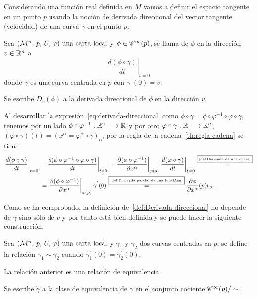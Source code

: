Considerando una función real definida en $M$ vamos a definir el espacio tangente en un
punto $p$ usando la noción de derivada direccional del vector tangente (velocidad) de una curva
$\gamma$ en el punto $p$.

\begin{definition}
  Sea $(\mathcal{M}^n,\thinspace p,\thinspace U,\thinspace \varphi)\textmd{ una carta local}$ y $\phi\in\mathscr{C}^\infty(p)$, se llama
   de $\phi$ en la dirección $v\in\mathbb{R}^n$ a
  \begin{equation}
    \label{eq:derivada-direccional}
    \left.\frac{d(\phi\circ\gamma)}{dt}\right|_{t=0}
  \end{equation}
  donde $\gamma$ es una curva centrada en $p$ con $\gamma^{'}(0)=v$.
\end{definition}
\begin{notation}
  Se escribe $D_v(\phi)$ a la derivada direccional de $\phi$ en la dirección $v$.
\end{notation}
Al desarrollar la expresión~\ref{eq:derivada-direccional} como
$\phi\circ\gamma=\phi\circ\varphi^{-1}\circ\varphi\circ\gamma$, tenemos por un lado
$\phi\circ\varphi^{-1}:\mathbb{R}^n\longrightarrow \mathbb{R}$
y por otro
$\varphi\circ\gamma:\mathbb{R}\longrightarrow \mathbb{R}^n$, $(\varphi\circ\gamma)(t)=
(x^\alpha=\varphi^\alpha\circ\gamma)_{\alpha}$,
por la regla de la cadena~\ref{th:regla-cadena} se tiene
\begin{multline}\label{eq:desarrollo-vector-tangente}
  \left.\frac{d(\phi\circ\gamma)}{dt}\right|_{t=0}=
  \left.\frac{d(\phi\circ\varphi^{-1}\circ\varphi\circ\gamma)}{dt}\right|_{t=0}=
  \left.\frac{\partial(\phi\circ\varphi^{-1})}{\partial x^\alpha}\right|_{\varphi(p)}
  \left.\frac{d(\varphi\circ\gamma)}{dt}\right|_{t=0}\overset{\fbox{\tiny \ref{def:Derivada de una curva}}}{=}\\
  =\left.\frac{\partial(\phi\circ\varphi^{-1})}{\partial x^\alpha}\right|_{\varphi(p)}
  \gamma^{'}(0)\overset{\fbox{\tiny \ref{def:Derivada parcial de una función}}}{=}
  \frac{\partial\phi}{\partial x^\alpha}(p) v_\alpha.
\end{multline}

Como se ha comprobado, la definición de~\ref{def:Derivada direccional} no depende de $\gamma$
sino sólo de $v$ y por tanto está bien definida y se puede hacer la siguiente construcción.

Sea $(\mathcal{M}^n,\thinspace p,\thinspace U,\thinspace \varphi)\textmd{ una carta local}$ y $\gamma_1$ y $\gamma_2$ dos curvas centradas en $p$, se define la relación
$\gamma_1\sim\gamma_2$ cuando $\gamma_1^{'}(0)=\gamma_2^{'}(0)$.

\begin{exercise}
  \label{ex:relacion-equivalencia}
  La relación anterior es una relación de equivalencia.
\end{exercise}
\begin{notation}
Se escribe $\mathring{\gamma}$ a la clase de equivalencia de $\gamma$ en el conjunto cociente
$\mathscr{C}^\infty(p)/\sim$.
\end{notation}

